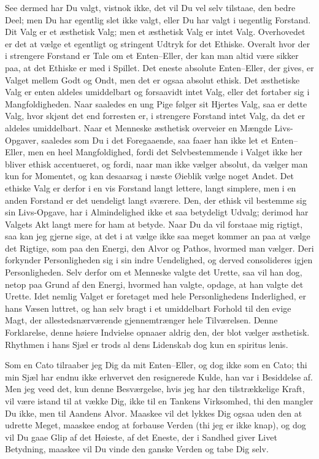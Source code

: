 \documentclass[12pt,a4paper]{article}
\begin{document}
See dermed har Du valgt, vistnok ikke, det vil Du vel selv tilstaae, den bedre Deel; men Du har egentlig slet ikke valgt, eller Du har valgt i uegentlig Forstand. Dit Valg er et æsthetisk Valg; men et æsthetisk Valg er intet Valg. Overhovedet er det at vælge et egentligt og stringent Udtryk for det Ethiske. Overalt hvor der i strengere Forstand er Tale om et Enten–Eller, der kan man altid være sikker paa, at det Ethiske er med i Spillet. Det eneste absolute Enten–Eller, der gives, er Valget mellem Godt og Ondt, men det er ogsaa absolut ethisk. Det æsthetiske Valg er enten aldeles umiddelbart og forsaavidt intet Valg, eller det fortaber sig i Mangfoldigheden. Naar saaledes en ung Pige følger sit Hjertes Valg, saa er dette Valg, hvor skjønt det end forresten er, i strengere Forstand intet Valg, da det er aldeles umiddelbart. Naar et Menneske æsthetisk overveier en Mængde Livs-Opgaver, saaledes som Du i det Foregaaende, saa faaer han ikke let et Enten–Eller, men en heel Mangfoldighed, fordi det Selvbestemmende i Valget ikke her bliver ethisk accentueret, og fordi, naar man ikke vælger absolut, da vælger man kun for Momentet, og kan desaarsag i næste Øieblik vælge noget Andet. Det ethiske Valg er derfor i en vis Forstand langt lettere, langt simplere, men i en anden Forstand er det uendeligt langt sværere. Den, der ethisk vil bestemme sig sin Livs-Opgave, har i Almindelighed ikke et saa betydeligt Udvalg; derimod har Valgets Akt langt mere for ham at betyde. Naar Du da vil forstaae mig rigtigt, saa kan jeg gjerne sige, at det i at vælge ikke saa meget kommer an paa at vælge det Rigtige, som paa den Energi, den Alvor og Pathos, hvormed man vælger. Deri forkynder Personligheden sig i sin indre Uendelighed, og derved consolideres igjen Personligheden. Selv derfor om et Menneske valgte det Urette, saa vil han dog, netop paa Grund af den Energi, hvormed han valgte, opdage, at han valgte det Urette. Idet nemlig Valget er foretaget med hele Personlighedens Inderlighed, er hans Væsen luttret, og han selv bragt i et umiddelbart Forhold til den evige Magt, der allestedsnærværende gjennemtrænger hele Tilværelsen. Denne Forklarelse, denne høiere Indvielse opnaaer aldrig den, der blot vælger æsthetisk. Rhythmen i hans Sjæl er trods al dens Lidenskab dog kun en spiritus lenis.

Som en Cato tilraaber jeg Dig da mit Enten–Eller, og dog ikke som en Cato; thi min Sjæl har endnu ikke erhvervet den resignerede Kulde, han var i Besiddelse af. Men jeg veed det, kun denne Besværgelse, hvis jeg har den tilstrækkelige Kraft, vil være istand til at vække Dig, ikke til en Tankens Virksomhed, thi den mangler Du ikke, men til Aandens Alvor. Maaskee vil det lykkes Dig ogsaa uden den at udrette Meget, maaskee endog at forbause Verden (thi jeg er ikke knap), og dog vil Du gaae Glip af det Høieste, af det Eneste, der i Sandhed giver Livet Betydning, maaskee vil Du vinde den ganske Verden og tabe Dig selv.
\end{document}
